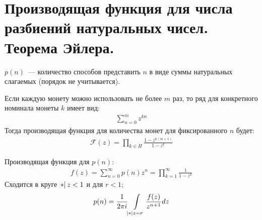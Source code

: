 \section{Производящая функция для числа разбиений натуральных чисел. Теорема Эйлера.}

\begin{definition}
    $p(n)$~--- количество способов представить
    $n$ в виде суммы натуральных слагаемых (порядок не учитывается). 
\end{definition}

\example \; Если каждую монету можно использовать не более $m$ раз, то ряд для конкретного номинала монеты $k$ имеет вид: 
\begin{gather*}
    \sum\limits_{n=0}^m z^{kn}
\end{gather*}
Тогда производящая функция для количества монет для фиксированного $n$ будет: 
\begin{gather*}
    \mathcal{F}(z) = \prod\limits_{k \in H} \frac{1 - z^{k(m+1)}}{1 - z^k}
\end{gather*}

\begin{theorem}
    Производящая функция для $p(n)$: 
    \begin{gather*}
        f(z) = \sum\limits_{n=0}^{\infty} p(n) z^n = \prod_{k=1}^{\infty} \frac{1}{1-z^k}
    \end{gather*}
    Сходится в круге
    $\abs z < 1$ и для $r < 1$;
    \begin{gather*}
        p(n) = \frac{1}{2\pi i} \int\limits_{\abs z = r}\frac{f(z)}{z^{n+1}}dz
    \end{gather*}
\end{theorem}

